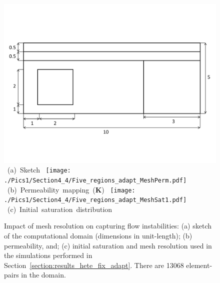 \begin{figure}[ht] 
\vbox{
\vspace{-.5cm}
\hbox{\hspace{.8cm}
\includegraphics[width=\textwidth, height=0.45\textwidth]{./Pics1/Section4_4/Sketch_5Regions.pdf}}
\vspace{-.5cm}
\hbox{\hspace{3.5cm} (a) Sketch}
\hbox{\hspace{1cm}
\texttt{[image: ./Pics1/Section4\_4/Five\_regions\_adapt\_MeshPerm.pdf]}}
\vspace{-1.0cm}
\hbox{\hspace{3.5cm} (b) Permeability mapping ({\bf K})}
\vspace{0.0cm}
\hbox{\hspace{1cm}
\texttt{[image: ./Pics1/Section4\_4/Five\_regions\_adapt\_MeshSat1.pdf]}}
\vspace{-1.0cm}
\hbox{\hspace{3.5cm} (c) Initial saturation distribution}}
\caption{Impact of mesh resolution on capturing flow instabilities: (a) sketch of the computational domain (dimensions in unit-length); (b) permeability, and; (c) initial saturation and  mesh resolution used in the simulations performed in Section~\ref{section:results_hete_fix_adapt}. There are 13068  element-pairs in the domain.}
\label{fig:testcase_heter_domain}
\end{figure}
\clearpage



